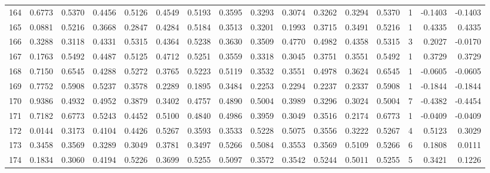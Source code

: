 \begin{tabular}{lrrrrrrrrrrrrrrr}
164 &      0.6773 &  0.5370 &  0.4456 &  0.5126 &  0.4549 &  0.5193 &  0.3595 &  0.3293 &  0.3074 &  0.3262 &   0.3294 &     0.5370 &      1 &                   -0.1403 &                    -0.1403 \\
165 &      0.0881 &  0.5216 &  0.3668 &  0.2847 &  0.4284 &  0.5184 &  0.3513 &  0.3201 &  0.1993 &  0.3715 &   0.3491 &     0.5216 &      1 &                    0.4335 &                     0.4335 \\
166 &      0.3288 &  0.3118 &  0.4331 &  0.5315 &  0.4364 &  0.5238 &  0.3630 &  0.3509 &  0.4770 &  0.4982 &   0.4358 &     0.5315 &      3 &                    0.2027 &                    -0.0170 \\
167 &      0.1763 &  0.5492 &  0.4487 &  0.5125 &  0.4712 &  0.5251 &  0.3559 &  0.3318 &  0.3045 &  0.3751 &   0.3551 &     0.5492 &      1 &                    0.3729 &                     0.3729 \\
168 &      0.7150 &  0.6545 &  0.4288 &  0.5272 &  0.3765 &  0.5223 &  0.5119 &  0.3532 &  0.3551 &  0.4978 &   0.3624 &     0.6545 &      1 &                   -0.0605 &                    -0.0605 \\
169 &      0.7752 &  0.5908 &  0.5237 &  0.3578 &  0.2289 &  0.1895 &  0.3484 &  0.2253 &  0.2294 &  0.2237 &   0.2337 &     0.5908 &      1 &                   -0.1844 &                    -0.1844 \\
170 &      0.9386 &  0.4932 &  0.4952 &  0.3879 &  0.3402 &  0.4757 &  0.4890 &  0.5004 &  0.3989 &  0.3296 &   0.3024 &     0.5004 &      7 &                   -0.4382 &                    -0.4454 \\
171 &      0.7182 &  0.6773 &  0.5243 &  0.4452 &  0.5100 &  0.4840 &  0.4986 &  0.3959 &  0.3049 &  0.3516 &   0.2174 &     0.6773 &      1 &                   -0.0409 &                    -0.0409 \\
172 &      0.0144 &  0.3173 &  0.4104 &  0.4426 &  0.5267 &  0.3593 &  0.3533 &  0.5228 &  0.5075 &  0.3556 &   0.3222 &     0.5267 &      4 &                    0.5123 &                     0.3029 \\
173 &      0.3458 &  0.3569 &  0.3289 &  0.3049 &  0.3781 &  0.3497 &  0.5266 &  0.5084 &  0.3553 &  0.3569 &   0.5109 &     0.5266 &      6 &                    0.1808 &                     0.0111 \\
174 &      0.1834 &  0.3060 &  0.4194 &  0.5226 &  0.3699 &  0.5255 &  0.5097 &  0.3572 &  0.3542 &  0.5244 &   0.5011 &     0.5255 &      5 &                    0.3421 &                     0.1226 \\

\end{tabular}
